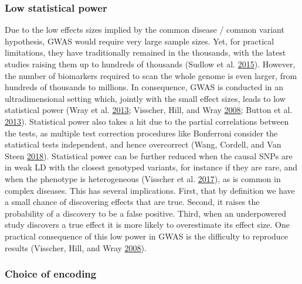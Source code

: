 \documentclass[
  11pt,
]{env/yjiao}
\begin{document}
\hypertarget{low-statistical-power}{%
\subsubsection{Low statistical power}\label{low-statistical-power}}

Due to the low effects sizes implied by the common disease / common variant hypothesis, GWAS would require very large sample sizes. Yet, for practical limitations, they have traditionally remained in the thousands, with the latest studies raising them up to hundreds of thousands (Sudlow et al. \protect\hyperlink{ref-sudlow_uk_2015}{2015}). However, the number of biomarkers required to scan the whole genome is even larger, from hundreds of thousands to millions. In consequence, GWAS is conducted in an ultradimensional setting which, jointly with the small effect sizes, leads to low statistical power (Wray et al. \protect\hyperlink{ref-wray_pitfalls_2013}{2013}; Visscher, Hill, and Wray \protect\hyperlink{ref-visscher_heritability_2008}{2008}; Button et al. \protect\hyperlink{ref-button_power_2013}{2013}). Statistical power also takes a hit due to the partial correlations between the tests, as multiple test correction procedures like Bonferroni consider the statistical tests independent, and hence overcorrect (Wang, Cordell, and Van Steen \protect\hyperlink{ref-wang_statistical_2018}{2018}). Statistical power can be further reduced when the causal SNPs are in weak LD with the closest genotyped variants, for instance if they are rare, and when the phenotype is heterogeneous (Visscher et al. \protect\hyperlink{ref-visscher_10_2017}{2017}), as is common in complex diseases. This has several implications. First, that by definition we have a small chance of discovering effects that are true. Second, it raises the probability of a discovery to be a false positive. Third, when an underpowered study discovers a true effect it is more likely to overestimate its effect size. One practical consequence of this low power in GWAS is the difficulty to reproduce results (Visscher, Hill, and Wray \protect\hyperlink{ref-visscher_heritability_2008}{2008}).

\hypertarget{encoding}{%
\subsubsection{Choice of encoding}\label{encoding}}
\end{document}
